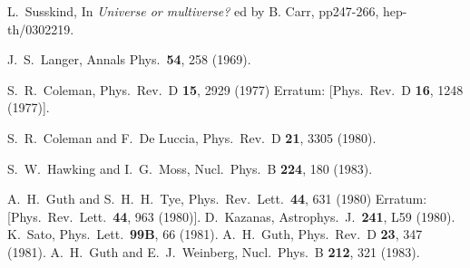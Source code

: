   L.~Susskind,
  In {\it Universe or multiverse?} ed by B. Carr, pp247-266, 
hep-th/0302219. 

  J.~S.~Langer,
  Annals Phys.\  {\bf 54}, 258 (1969).

  S.~R.~Coleman,
  Phys.\ Rev.\ D {\bf 15}, 2929 (1977)
  Erratum: [Phys.\ Rev.\ D {\bf 16}, 1248 (1977)].

  S.~R.~Coleman and F.~De Luccia,
  Phys.\ Rev.\ D {\bf 21}, 3305 (1980). 

  S.~W.~Hawking and I.~G.~Moss,
  Nucl.\ Phys.\ B {\bf 224}, 180 (1983).

  A.~H.~Guth and S.~H.~H.~Tye,
  Phys.\ Rev.\ Lett.\  {\bf 44}, 631 (1980)
  Erratum: [Phys.\ Rev.\ Lett.\  {\bf 44}, 963 (1980)].
  D.~Kazanas,
  Astrophys.\ J.\  {\bf 241}, L59 (1980).
  K.~Sato,
  Phys.\ Lett.\  {\bf 99B}, 66 (1981).
  A.~H.~Guth,
  Phys.\ Rev.\ D {\bf 23}, 347 (1981).
  A.~H.~Guth and E.~J.~Weinberg,
  Nucl.\ Phys.\ B {\bf 212}, 321 (1983).


